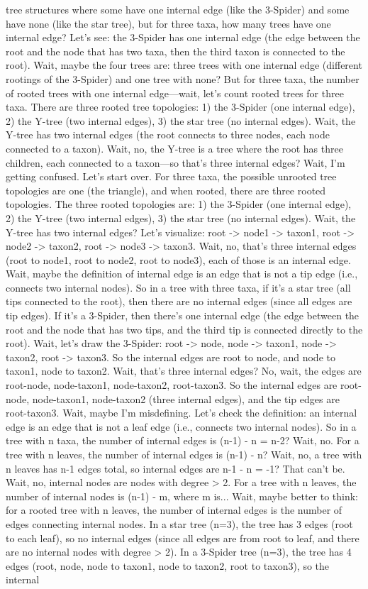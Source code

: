 tree structures where some have one internal edge (like the 3-Spider) and some have none (like the star tree), but for three taxa, how many trees have one internal edge? Let's see: the 3-Spider has one internal edge (the edge between the root and the node that has two taxa, then the third taxon is connected to the root). Wait, maybe the four trees are: three trees with one internal edge (different rootings of the 3-Spider) and one tree with none? But for three taxa, the number of rooted trees with one internal edge—wait, let's count rooted trees for three taxa. There are three rooted tree topologies: 1) the 3-Spider (one internal edge), 2) the Y-tree (two internal edges), 3) the star tree (no internal edges). Wait, the Y-tree has two internal edges (the root connects to three nodes, each node connected to a taxon). Wait, no, the Y-tree is a tree where the root has three children, each connected to a taxon—so that's three internal edges? Wait, I'm getting confused. Let's start over. For three taxa, the possible unrooted tree topologies are one (the triangle), and when rooted, there are three rooted topologies. The three rooted topologies are: 1) the 3-Spider (one internal edge), 2) the Y-tree (two internal edges), 3) the star tree (no internal edges). Wait, the Y-tree has two internal edges? Let's visualize: root -> node1 -> taxon1, root -> node2 -> taxon2, root -> node3 -> taxon3. Wait, no, that's three internal edges (root to node1, root to node2, root to node3), each of those is an internal edge. Wait, maybe the definition of internal edge is an edge that is not a tip edge (i.e., connects two internal nodes). So in a tree with three taxa, if it's a star tree (all tips connected to the root), then there are no internal edges (since all edges are tip edges). If it's a 3-Spider, then there's one internal edge (the edge between the root and the node that has two tips, and the third tip is connected directly to the root). Wait, let's draw the 3-Spider: root -> node, node -> taxon1, node -> taxon2, root -> taxon3. So the internal edges are root to node, and node to taxon1, node to taxon2. Wait, that's three internal edges? No, wait, the edges are root-node, node-taxon1, node-taxon2, root-taxon3. So the internal edges are root-node, node-taxon1, node-taxon2 (three internal edges), and the tip edges are root-taxon3. Wait, maybe I'm misdefining. Let's check the definition: an internal edge is an edge that is not a leaf edge (i.e., connects two internal nodes). So in a tree with n taxa, the number of internal edges is (n-1) - n = n-2? Wait, no. For a tree with n leaves, the number of internal edges is (n-1) - n? Wait, no, a tree with n leaves has n-1 edges total, so internal edges are n-1 - n = -1? That can't be. Wait, no, internal nodes are nodes with degree > 2. For a tree with n leaves, the number of internal nodes is (n-1) - m, where m is... Wait, maybe better to think: for a rooted tree with n leaves, the number of internal edges is the number of edges connecting internal nodes. In a star tree (n=3), the tree has 3 edges (root to each leaf), so no internal edges (since all edges are from root to leaf, and there are no internal nodes with degree > 2). In a 3-Spider tree (n=3), the tree has 4 edges (root, node, node to taxon1, node to taxon2, root to taxon3), so the internal 